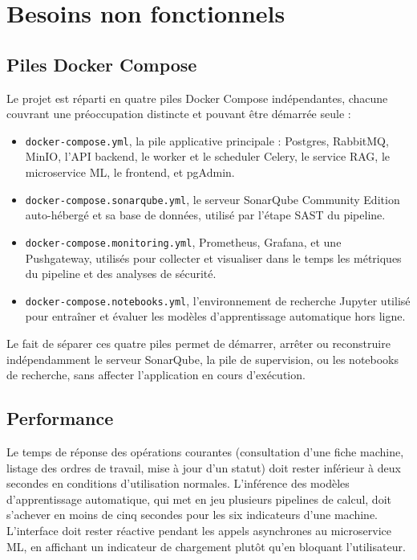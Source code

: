 \section{Besoins non fonctionnels}

\subsection{Piles Docker Compose}

Le projet est réparti en quatre piles Docker Compose indépendantes, chacune couvrant une préoccupation distincte et pouvant être démarrée seule :

\begin{itemize}
\item \texttt{docker-compose.yml}, la pile applicative principale : Postgres, RabbitMQ, MinIO, l'API backend, le worker et le scheduler Celery, le service RAG, le microservice ML, le frontend, et pgAdmin.
\item \texttt{docker-compose.sonarqube.yml}, le serveur SonarQube Community Edition auto-hébergé et sa base de données, utilisé par l'étape SAST du pipeline.
\item \texttt{docker-compose.monitoring.yml}, Prometheus, Grafana, et une Pushgateway, utilisés pour collecter et visualiser dans le temps les métriques du pipeline et des analyses de sécurité.
\item \texttt{docker-compose.notebooks.yml}, l'environnement de recherche Jupyter utilisé pour entraîner et évaluer les modèles d'apprentissage automatique hors ligne.
\end{itemize}

Le fait de séparer ces quatre piles permet de démarrer, arrêter ou reconstruire indépendamment le serveur SonarQube, la pile de supervision, ou les notebooks de recherche, sans affecter l'application en cours d'exécution.

\subsection{Performance}

Le temps de réponse des opérations courantes (consultation d'une fiche machine, listage des ordres de travail, mise à jour d'un statut) doit rester inférieur à deux secondes en conditions d'utilisation normales.
L'inférence des modèles d'apprentissage automatique, qui met en jeu plusieurs pipelines de calcul, doit s'achever en moins de cinq secondes pour les six indicateurs d'une machine.
L'interface doit rester réactive pendant les appels asynchrones au microservice ML, en affichant un indicateur de chargement plutôt qu'en bloquant l'utilisateur.

